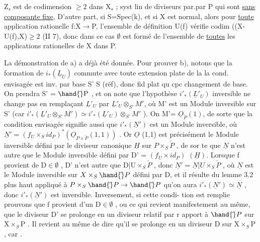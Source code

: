 
Z$_s$ est de codimension $\geq 2$ dans X$_s$ ; 
 syst lin de diviseurs par.par P qui sont
\uline{sans composante fixe},  D'autre part, si
S=Spec(k), et si X est normal, alors pour \uline{toute} application rationelle
f:X$\to$P, l'ensemble de définition U(f) vérifie codim ((X-U(f),X)$\geq$2
(II 7), donc dans ce cas $\emptyset$ est formé de l'ensemble de \uline{toutes} les
applications rationelles de X dans P.

La démonstration de a) a déjà été donnée. Pour prouver b), notons
que la formation de $i_*(\underline{L}_U)$ commute avec toute extension plate de la
 la cond. envisagée est inv. par
base S' \quad S (réf), donc  fid plat qu cpc
 changement de base. On
prendra S' = $\hand{\check{}}\mathrm{P}$ , et on note que l'hypothèse $i'_*(\underline{L}'_U)$ inversible ne
change pas en remplaçant $\underline{L}'_U$ par $\underline{L}'_U\otimes_{S'}M'$, où M' est un Module inversible
sur S' (car $i'_*(\underline{L}'_U\otimes_{S'}M')\simeq i'_*(\underline{L}'_U)\otimes_{S'}M'$ ). On  M'= $\underline{O}_{\check{P}}(1)$, de
sorte que la condition envisagée signifie aussi que $i'_*(\underline{N}')$ est un Module
inversible, où $\underline{N}'= (f_U\times_S id_P)^*(\underline{O}_{P\times\check{P}}(1,1))$ . Or $\underline{O}$ (1,1) est précisément
le Module inversible défini par le diviseur canonique $\underline{H}$ sur $P\times_S\check{P}$ , de sor%
te que $\underline{N}$ n'est autre que le Module inversible défini par \qquad D' =
$(f_U\times id_P)$ $(\underline{H})$.  Lorsque f provient de D$\in\emptyset$ , 
D' n'est autre que D$|$U$\times_S\check{P}$ ,  donc $\underline{N}' = \underline{N}|U\times_S\check{P}$ ,
où $\underline{N}$ est le Module inversible sur $X\times_S\hand{\check{}}P$ défini par D, et il résulte
du lemme 3.2 plus haut  appliqué à $P\times_S\hand{\check{}}P\to\hand{\check{}}P$ qu'on aura
$i'_*(\underline{N}')\simeq\underline{N}$ , donc $i'_*(\underline{N}')$ est inversible. Inversement, si cette condi-%
tion est remplie prouvons que f provient d'un D$\in\emptyset$ , ou ce qui revient
manifestement au même, que le diviseur D' se prolonge en un diviseur 
 relatif par r apport  à $\hand{\check{}}P$ sur X$\times_S$P . Il  revient au même
de dire qu'il se prolonge en un diviseur  D sur X$\times_S$P , car .


